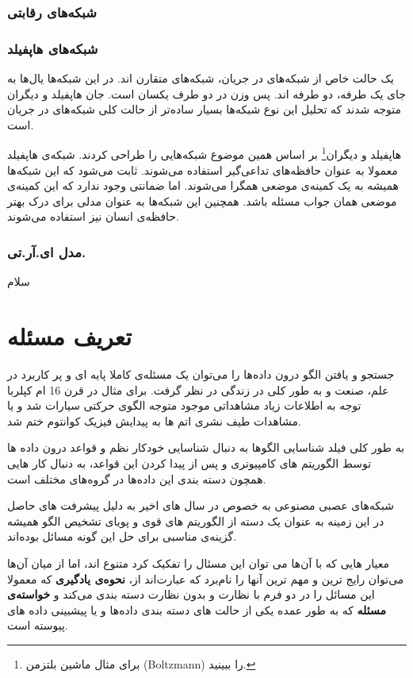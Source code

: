 \documentclass[11pt,a4paper,twocolumn]{article}
\begin{document}
\subsubsection{شبکه‌های رقابتی}


\subsubsection{شبکه‌های هاپفیلد}
یک حالت خاص از شبکه‌های در جریان، شبکه‌های متقارن اند. در این شبکه‌ها یال‌ها به جای یک طرفه، دو طرفه اند. پس وزن در دو طرف یکسان است. جان هاپفیلد و دیگران متوجه شدند که تحلیل این نوع شبکه‌ها بسیار ساده‌تر از حالت کلی شبکه‌های در جریان است.

هاپفیلد و
دیگران\footnote{برای مثال ماشین بلتزمن (Boltzmann) را ببینید.}
بر اساس همین موضوع شبکه‌هایی را طراحی کردند. شبکه‌ی هاپفیلد معمولا به عنوان 
حافظه‌های تداعی‌گیر
استفاده می‌شوند. ثابت می‌شود که این شبکه‌ها همیشه به یک
کمینه‌ی موضعی
همگرا می‌شوند. اما ضمانتی وجود ندارد که این کمینه‌ی موضعی همان جواب مسئله باشد. همچنین این شبکه‌ها به عنوان مدلی برای درک بهتر حافظه‌ی انسان نیز استفاده می‌شوند.\cite{wiki-hopfield_net}
\subsubsection{مدل ای.آر.تی.}
سلام
\section{تعریف مسئله}
جستجو و یافتن الگو درون داده‌ها را می‌توان یک مسئله‌ی کاملا پایه ای و پر کاربرد در علم، صنعت و به طور کلی در زندگی در نظر گرفت. برای مثال در قرن 16 ام کپلربا توجه به اطلاعات زیاد مشاهداتی موجود متوجه الگوی حرکتی سیارات ‌شد و یا مشاهدات طیف نشری اتم ها به پیدایش فیزیک کوانتوم ختم شد.

به طور کلی فیلد شناسایی الگوها به دنبال شناسایی خودکار نظم و قواعد درون داده ها توسط الگوریتم های کامپیوتری و پس از پیدا کردن این قواعد، به دنبال کار هایی همچون دسته بندی این داده‌ها در گروه‌های مختلف است.
\cite[ص-۱]{bishop}

شبکه‌های عصبی مصنوعی به خصوص در سال های اخیر به دلیل پیشرفت های حاصل در این زمینه  به عنوان یک دسته از الگوریتم های قوی و پویای تشخیص الگو همیشه گزینه‌ی مناسبی برای حل این گونه مسائل بوده‌اند.

معیار هایی که با آن‌ها می توان این مسئال را تفکیک کرد متنوع اند، اما از میان آن‌ها می‌توان رایج ترین و مهم ترین آنها را نام‌برد که عبارت‌اند از، \textbf{نحوه‌ی یادگیری} که معمولا این مسائل را در دو فرم با نظارت و بدون نظارت دسته بندی می‌کند و \textbf{خواسته‌ی مسئله} که به طور عمده یکی از حالت های دسته بندی داده‌ها و یا پیشبینی داده های پیوسته است.
\end{document}
